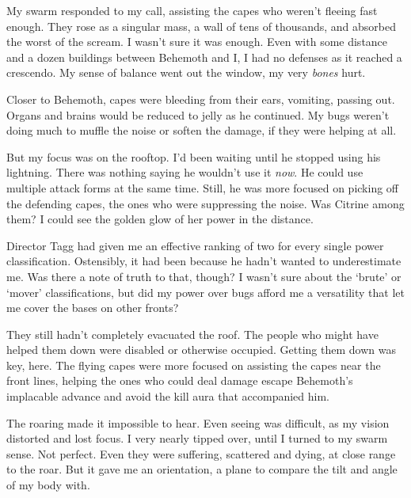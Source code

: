 My swarm responded to my call, assisting the capes who weren't fleeing fast enough.  They rose as a singular mass, a wall of tens of thousands, and absorbed the worst of the scream.  I wasn't sure it was enough.  Even with some distance and a dozen buildings between Behemoth and I, I had no defenses as it reached a crescendo.  My sense of balance went out the window, my very \emph{bones} hurt.



Closer to Behemoth, capes were bleeding from their ears, vomiting, passing out.  Organs and brains would be reduced to jelly as he continued.  My bugs weren't doing much to muffle the noise or soften the damage, if they were helping at all.



But my focus was on the rooftop.  I'd been waiting until he stopped using his lightning.  There was nothing saying he wouldn't use it \emph{now}.  He could use multiple attack forms at the same time.  Still, he was more focused on picking off the defending capes, the ones who were suppressing the noise.  Was Citrine among them?  I could see the golden glow of her power in the distance.



Director Tagg had given me an effective ranking of two for every single power classification.  Ostensibly, it had been because he hadn't wanted to underestimate me.  Was there a note of truth to that, though?  I wasn't sure about the `brute' or `mover' classifications, but did my power over bugs afford me a versatility that let me cover the bases on other fronts?



They still hadn't completely evacuated the roof.  The people who might have helped them down were disabled or otherwise occupied.  Getting them down was key, here.  The flying capes were more focused on assisting the capes near the front lines, helping the ones who could deal damage escape Behemoth's implacable advance and avoid the kill aura that accompanied him.



The roaring made it impossible to hear.  Even seeing was difficult, as my vision distorted and lost focus.  I very nearly tipped over, until I turned to my swarm sense.  Not perfect.  Even they were suffering, scattered and dying, at close range to the roar.  But it gave me an orientation, a plane to compare the tilt and angle of my body with.



